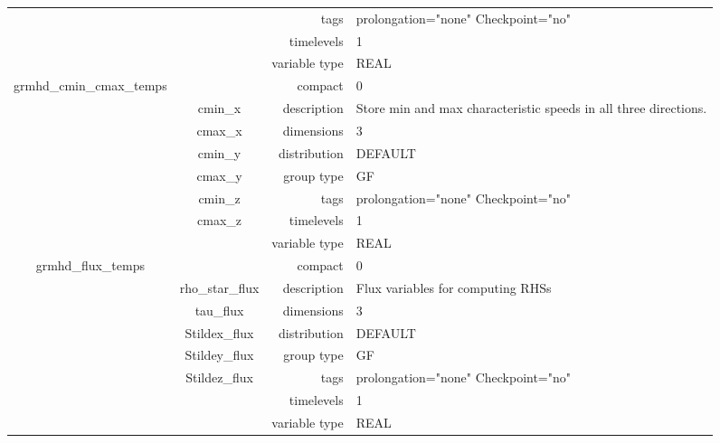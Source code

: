 \begin{tabular*}{150mm}{|c|c@{\extracolsep{\fill}}|rl|}
 &  & tags & prolongation="none" Checkpoint="no" \\ 
 &  & timelevels & 1 \\ 
 &  & variable type & REAL \\ 
\hline 
grmhd\_cmin\_cmax\_temps &  & compact & 0 \\ 
 & cmin\_x & description & Store min and max characteristic speeds in all three directions. \\ 
 & cmax\_x & dimensions & 3 \\ 
 & cmin\_y & distribution & DEFAULT \\ 
 & cmax\_y & group type & GF \\ 
 & cmin\_z & tags & prolongation="none" Checkpoint="no" \\ 
 & cmax\_z & timelevels & 1 \\ 
 &  & variable type & REAL \\ 
\hline 
grmhd\_flux\_temps &  & compact & 0 \\ 
 & rho\_star\_flux & description & Flux variables for computing RHSs \\ 
 & tau\_flux & dimensions & 3 \\ 
 & Stildex\_flux & distribution & DEFAULT \\ 
 & Stildey\_flux & group type & GF \\ 
 & Stildez\_flux & tags & prolongation="none" Checkpoint="no" \\ 
 &  & timelevels & 1 \\ 
 &  & variable type & REAL \\ 
\hline 
\end{tabular*} 



\vspace{5mm}
\vspace{5mm}

